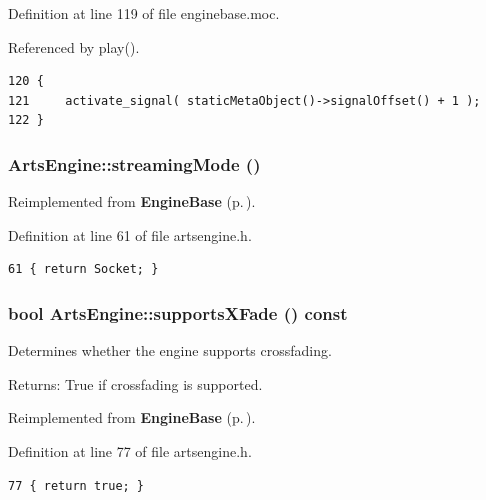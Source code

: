 Definition at line 119 of file enginebase.moc.

Referenced by play().



\footnotesize\begin{verbatim}120 {
121     activate_signal( staticMetaObject()->signalOffset() + 1 );
122 }
\end{verbatim}\normalsize 
{}
\subsubsection{ Arts\-Engine::streaming\-Mode ()\hspace{0.3cm}{\tt  [inline, virtual]}}\label{classArtsEngine_ArtsEnginea5}




Reimplemented from {\bf Engine\-Base} {\rm (p.\,\pageref{classEngineBase_EngineBasea5})}.

Definition at line 61 of file artsengine.h.



\footnotesize\begin{verbatim}61 { return Socket; }
\end{verbatim}\normalsize 
{}
\subsubsection{\setlength{\rightskip}{0pt plus 5cm}bool Arts\-Engine::supports\-XFade () const\hspace{0.3cm}{\tt  [inline, virtual]}}\label{classArtsEngine_ArtsEnginea18}


Determines whether the engine supports crossfading. \begin{Desc}
\item[Returns:]True if crossfading is supported. \end{Desc}


Reimplemented from {\bf Engine\-Base} {\rm (p.\,\pageref{classEngineBase_EngineBasea13})}.

Definition at line 77 of file artsengine.h.



\footnotesize\begin{verbatim}77 { return true; }
\end{verbatim}\normalsize 
{}
